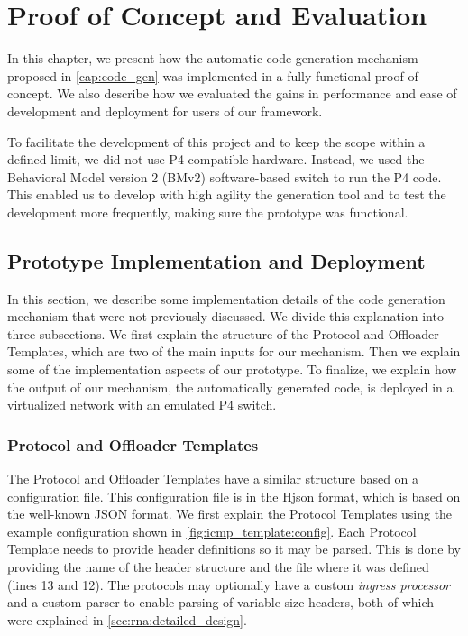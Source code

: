 \chapter{Proof of Concept and Evaluation}
\label{cap:evaluation}

In this chapter, we present how the automatic code generation mechanism proposed in \autoref{cap:code_gen} was implemented in a fully functional proof of concept. We also describe how we evaluated the gains in performance and ease of development and deployment for users of our framework.

To facilitate the development of this project and to keep the scope within a defined limit, we did not use P4-compatible hardware. Instead, we used the Behavioral Model version 2 (BMv2) software-based switch \cite{BMv2} to run the P4 code. This enabled us to develop with high agility the generation tool and to test the development more frequently, making sure the prototype was functional.


\section{Prototype Implementation and Deployment}
\label{sec:evaluation:implementation}

In this section, we describe some implementation details of the code generation mechanism that were not previously discussed. We divide this explanation into three subsections. We first explain the structure of the Protocol and Offloader Templates, which are two of the main inputs for our mechanism. Then we explain some of the implementation aspects of our prototype. To finalize, we explain how the output of our mechanism, the automatically generated code, is deployed in a virtualized network with an emulated P4 switch.


\subsection{Protocol and Offloader Templates}

The Protocol and Offloader Templates have a similar structure based on a configuration file. This configuration file is in the Hjson \cite{Hjson} format, which is based on the well-known JSON format. We first explain the Protocol Templates using the example configuration shown in \autoref{fig:icmp_template:config}. Each Protocol Template needs to provide header definitions so it may be parsed. This is done by providing the name of the header structure and the file where it was defined (lines 13 and 12). The protocols may optionally have a custom \textit{ingress processor} and a custom parser to enable parsing of variable-size headers, both of which were explained in \autoref{sec:rna:detailed_design}.

